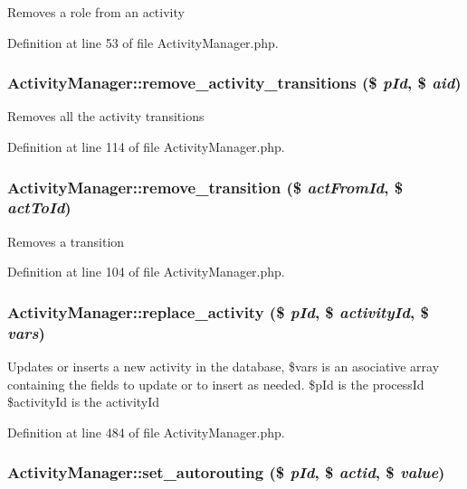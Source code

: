Removes a role from an activity 

Definition at line 53 of file Activity\-Manager.php.
\subsubsection{\setlength{\rightskip}{0pt plus 5cm}Activity\-Manager::remove\_\-activity\_\-transitions (\$ {\em p\-Id}, \$ {\em aid})}\label{classActivityManager_a8}


Removes all the activity transitions 

Definition at line 114 of file Activity\-Manager.php.
\subsubsection{\setlength{\rightskip}{0pt plus 5cm}Activity\-Manager::remove\_\-transition (\$ {\em act\-From\-Id}, \$ {\em act\-To\-Id})}\label{classActivityManager_a7}


Removes a transition 

Definition at line 104 of file Activity\-Manager.php.
\subsubsection{\setlength{\rightskip}{0pt plus 5cm}Activity\-Manager::replace\_\-activity (\$ {\em p\-Id}, \$ {\em activity\-Id}, \$ {\em vars})}\label{classActivityManager_a19}


Updates or inserts a new activity in the database, \$vars is an asociative array containing the fields to update or to insert as needed. \$p\-Id is the process\-Id \$activity\-Id is the activity\-Id 

Definition at line 484 of file Activity\-Manager.php.
\subsubsection{\setlength{\rightskip}{0pt plus 5cm}Activity\-Manager::set\_\-autorouting (\$ {\em p\-Id}, \$ {\em actid}, \$ {\em value})}\label{classActivityManager_a21}


